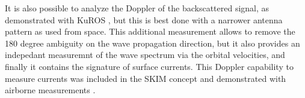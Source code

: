 
It is also possible to analyze the Doppler of the backscattered signal, as demonstrated with KuROS \citep{Caudal&al.2014}, but this is best done with a narrower antenna pattern as used from space. This additional measurement allows to remove the 180 degree ambiguity on the 
wave propagation direction, but it also provides an indepedant measuremnt of the wave spectrum via the orbital velocities, and finally it contains the signature of 
surface currents.  This Doppler capability to measure currents was included in the SKIM concept \citep{Ardhuin&al.2019e} and demonstrated with airborne measurements \citep{Marie&al.2020}.


